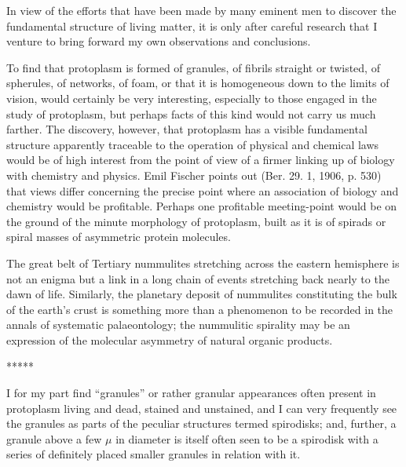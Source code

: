 \documentclass[a4paper, 12pt, oneside, landscape]{article}
\begin{document}
In view of the efforts that have been made by many eminent men to discover the fundamental structure of living matter, it is only after careful research that I venture to bring forward my own observations and conclusions.

To find that protoplasm is formed of granules, of fibrils straight or twisted, of spherules, of networks, of foam, or that it is homogeneous down to the limits of vision, would certainly be very interesting, especially to those engaged in the study of protoplasm, but perhaps facts of this kind would not carry us much farther. The discovery, however, that protoplasm has a visible fundamental structure apparently traceable to the operation of physical and chemical laws would be of high interest from the point of view of a firmer linking up of biology with chemistry and physics. Emil Fischer points out (Ber. 29. 1, 1906, p. 530) that views differ concerning the precise point where an association of biology and chemistry would be profitable. Perhaps one profitable meeting-point would be on the ground of the minute morphology of protoplasm, built as it is of spirads or spiral masses of asymmetric protein molecules.

The great belt of Tertiary nummulites stretching across the eastern hemisphere is not an enigma but a link in a long chain of events stretching back nearly to the dawn of life. Similarly, the planetary deposit of nummulites constituting the bulk of the earth's crust is something more than a phenomenon to be recorded in the annals of systematic palaeontology; the nummulitic spirality may be an expression of the molecular asymmetry of natural organic products.

\centerline{*\hspace{15mm}*\hspace{15mm}*\hspace{15mm}*\hspace{15mm}*}
\bigskip

I for my part find ``granules'' or rather granular appearances often present in protoplasm living and dead, stained and unstained, and I can very frequently see the granules as parts of the peculiar structures termed spirodisks; and, further, a granule above a few $\mu$ in diameter is itself often seen to be a spirodisk with a series of definitely placed smaller granules in relation with it.
\end{document}
